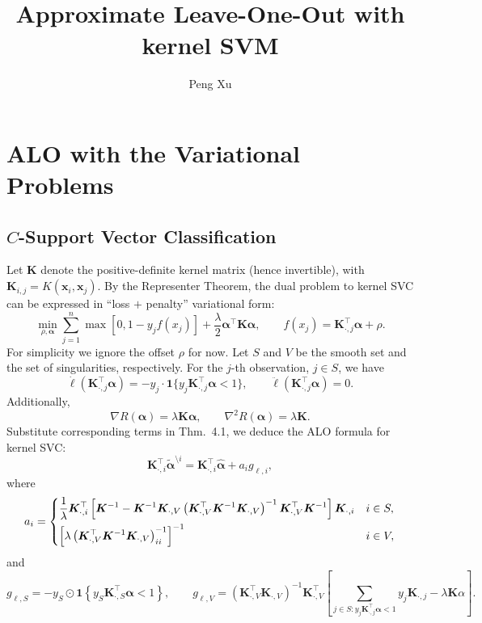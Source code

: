 \documentclass[11pt]{article}
\title{Approximate Leave-One-Out with kernel SVM}
\author{Peng Xu}
\newcommand{\bx}{\bm{x}}
\newcommand{\bK}{\bm{K}}
\newcommand{\balpha}{\bm{\alpha}}
\newcommand{\refthm}[2]{#1~#2}
\begin{document}
\maketitle

\section{ALO with the Variational Problems}
\subsection{\(C\)-Support Vector Classification}
Let \(\bK\) denote the positive-definite kernel matrix (hence invertible), with \(\bK_{i,j}=K(\bx_i,\bx_j)\). By the Representer Theorem, the dual problem to kernel SVC can be expressed in ``loss \(+\) penalty'' variational form:
\begin{equation}
\min_{\rho,\balpha}\sum_{j=1}^{n}\max\left[0, 1-y_jf(x_j)\right]+\frac{\lambda}{2}\balpha^\top\bK\balpha, \qquad f(x_j)=\bK_{\cdot,j}^\top\balpha+\rho.
\end{equation}
For simplicity we ignore the offset \(\rho\) for now. Let \(S\) and \(V\) be the smooth set and the set of singularities, respectively. For the \(j\)-th observation, \(j\in S\), we have \[\dot{\ell}(\bK_{\cdot,j}^\top\balpha)=-y_j\cdot\bm{1}\{y_j\bK_{\cdot,j}^\top\balpha<1\},\qquad\ddot{\ell}(\bK_{\cdot,j}^\top\balpha)=0.\] Additionally, \[\nabla R(\balpha)=\lambda\bK\balpha,\qquad\nabla^2R(\balpha)=\lambda\bK.\] Substitute corresponding terms in \refthm{Thm.}{4.1}, we deduce the ALO formula for kernel SVC: \[\bK_{\cdot,i}^\top\tilde{\balpha}^{\setminus i}=\bK_{\cdot,i}^\top\hat{\balpha}+a_ig_{\ell,i},\] where \[a_i=\begin{dcases}
\frac{1}{\lambda}\bK_{\cdot,i}^\top\left[\bK^{-1}-\bK^{-1}\bK_{\cdot,V}\left(\bK_{\cdot,V}^\top\bK^{-1}\bK_{\cdot,V}\right)^{-1}\bK_{\cdot,V}^\top\bK^{-1}\right]\bK_{\cdot,i} & i\in S,\\
\left[\lambda\left(\bK_{\cdot,V}^\top\bK^{-1}\bK_{\cdot,V}\right)^{-1}_{ii}\right]^{-1} & i\in V,
\end{dcases}\] and \[g_{\ell, S}=-y_S\odot\bm{1}\left\{y_S\bK_{\cdot,S}^\top\balpha<1\right\},\qquad g_{\ell, V}=\left(\bK_{\cdot,V}^\top\bK_{\cdot,V}\right)^{-1}\bK_{\cdot,V}^\top\left[\sum_{j\in S:y_j\bK_{\cdot,j}^\top\balpha<1}y_j\bK_{\cdot,j}-\lambda\bK\alpha\right].\]
\end{document}
